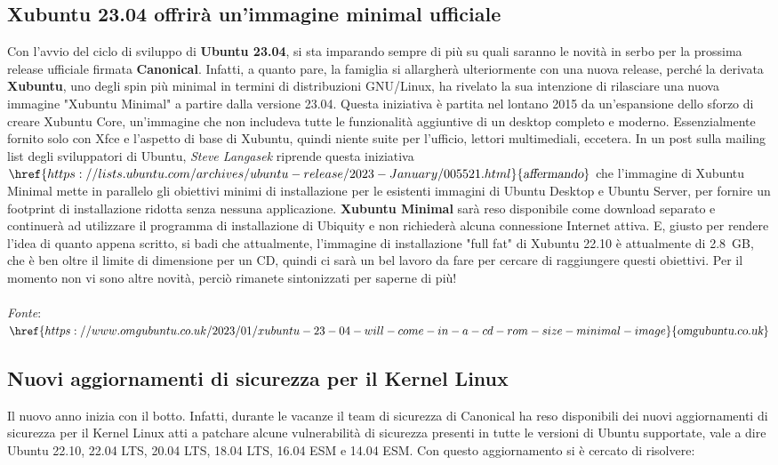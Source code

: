 \documentclass[a4paper,twoside]{article}
\begin{document}
\subsection{Xubuntu 23.04 offrirà un'immagine minimal ufficiale}
Con l'avvio del ciclo di sviluppo di \textbf{Ubuntu 23.04}, si sta imparando sempre di più su quali saranno le novità in serbo per la prossima release ufficiale firmata \textbf{Canonical}. Infatti, a quanto pare, la famiglia si allargherà ulteriormente con una nuova release, perché la derivata \textbf{Xubuntu}, uno degli spin più minimal in termini di distribuzioni GNU/Linux, ha rivelato la sua intenzione di rilasciare una nuova immagine "Xubuntu Minimal" a partire dalla versione 23.04. Questa iniziativa è partita nel lontano 2015 da un'espansione dello sforzo di creare Xubuntu Core, un'immagine che non includeva tutte le funzionalità aggiuntive di un desktop completo e moderno. Essenzialmente fornito solo con Xfce e l'aspetto di base di Xubuntu, quindi niente suite per l'ufficio, lettori multimediali, eccetera. In un post sulla mailing list degli sviluppatori di Ubuntu, \textit{Steve Langasek} riprende questa iniziativa $\href{https://lists.ubuntu.com/archives/ubuntu-release/2023-January/005521.html}{\textsl{affermando}}$ che l'immagine di  Xubuntu Minimal mette in parallelo gli obiettivi minimi di installazione per le esistenti immagini di Ubuntu Desktop e Ubuntu Server, per fornire un footprint di installazione ridotta senza nessuna applicazione. \textbf{Xubuntu Minimal} sarà reso disponibile come download separato e continuerà ad utilizzare il programma di installazione di Ubiquity e non richiederà alcuna connessione Internet attiva. E, giusto per rendere l'idea di quanto appena scritto, si badi che attualmente, l'immagine di installazione "full fat" di Xubuntu 22.10 è attualmente di \SI{2,8}{GB}, che è ben oltre il limite di dimensione per un CD, quindi ci sarà un bel lavoro da fare per cercare di raggiungere questi obiettivi. Per il momento non vi sono altre novità, perciò rimanete sintonizzati per saperne di più! \\
\\
\textit{Fonte}:\\
$\href{https://www.omgubuntu.co.uk/2023/01/xubuntu-23-04-will-come-in-a-cd-rom-size-minimal-image}{\textsl{omgubuntu.co.uk}}$

\subsection{Nuovi aggiornamenti di sicurezza per il Kernel Linux}
Il nuovo anno inizia con il botto. Infatti, durante le vacanze il team di sicurezza di Canonical ha reso disponibili dei nuovi aggiornamenti di sicurezza per il Kernel Linux atti a patchare alcune vulnerabilità di sicurezza presenti in tutte le versioni di Ubuntu supportate, vale a dire Ubuntu 22.10, 22.04 LTS, 20.04 LTS, 18.04 LTS, 16.04 ESM e 14.04 ESM. Con questo aggiornamento si è cercato di risolvere:
\end{document}
